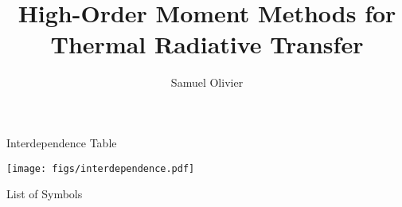 \documentclass[todo]{dissertation}
\begin{document}
\title{High-Order Moment Methods for Thermal Radiative Transfer}
\author{Samuel Olivier}
\maketitle

\copyrightpage



\begin{frontmatter}

\begin{KeepFromToc}
\tableofcontents
\end{KeepFromToc}
\clearpage

\begin{preamble}{Interdependence Table}
\vfill
\begin{center}
\label{preamble:interdependence}
\texttt{[image: figs/interdependence.pdf]}
\end{center}
\end{preamble}

\printglossary[style=april_gloss_style]
\clearpage

\begin{preamble}{List of Symbols}

\end{preamble}


\begin{preamble}{\acknowledgename}
\end{preamble}
\end{frontmatter}

\glsresetall %
\pagestyle{headings}










\glsresetall %

\clearpage
\printbibliography
\appendix 

\end{document}
